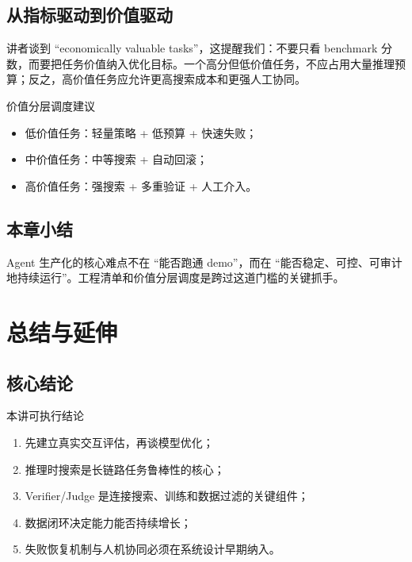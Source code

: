 \documentclass[a4paper]{article}
\begin{document}
\subsection{从指标驱动到价值驱动}
讲者谈到 ``economically valuable tasks''，这提醒我们：不要只看 benchmark 分数，而要把任务价值纳入优化目标。一个高分但低价值任务，不应占用大量推理预算；反之，高价值任务应允许更高搜索成本和更强人工协同。

\begin{importantbox}{价值分层调度建议}
\begin{itemize}
    \item 低价值任务：轻量策略 + 低预算 + 快速失败；
    \item 中价值任务：中等搜索 + 自动回滚；
    \item 高价值任务：强搜索 + 多重验证 + 人工介入。
\end{itemize}
\end{importantbox}

\subsection{本章小结}
Agent 生产化的核心难点不在 ``能否跑通 demo''，而在 ``能否稳定、可控、可审计地持续运行''。工程清单和价值分层调度是跨过这道门槛的关键抓手。

\section{总结与延伸}

\subsection{核心结论}
\begin{importantbox}{本讲可执行结论}
\begin{enumerate}
    \item 先建立真实交互评估，再谈模型优化；
    \item 推理时搜索是长链路任务鲁棒性的核心；
    \item Verifier/Judge 是连接搜索、训练和数据过滤的关键组件；
    \item 数据闭环决定能力能否持续增长；
    \item 失败恢复机制与人机协同必须在系统设计早期纳入。
\end{enumerate}
\end{importantbox}
\end{document}
